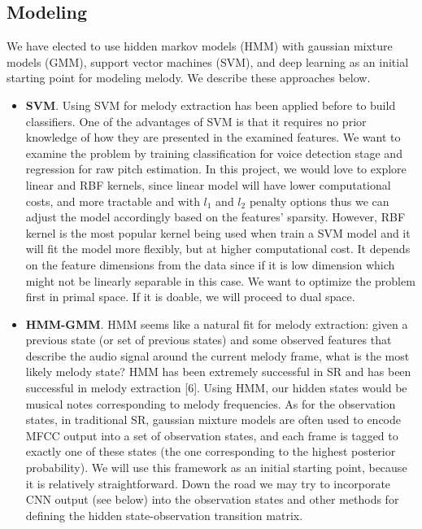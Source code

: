 \documentclass{article} %
\begin{document}
\subsection{Modeling}
We have elected to use hidden markov models (HMM) with gaussian mixture models (GMM), support vector machines (SVM), and deep learning as an initial starting point for modeling melody.  We describe these approaches below.
\begin{itemize}
\item \textbf{SVM}. Using SVM for melody extraction has been applied before to build classifiers. One of the advantages of SVM is that it requires no prior knowledge of how they are presented in the examined features. We want to examine the problem by training classification for voice detection stage and regression for raw pitch estimation. In this project, we would love to explore linear and RBF kernels, since linear model will have lower computational costs, and more tractable and with $l_{1}$ and $l_{2}$ penalty options thus we can adjust the model accordingly based on the features' sparsity. However, RBF kernel is the most popular kernel being used when train a SVM model and it will fit the model more flexibly, but at higher computational cost. It depends on the feature dimensions from the data since if it is low dimension which might not be linearly separable in this case. We want to optimize the problem first in primal space. If it is doable, we will proceed to dual space.  
\item \textbf{HMM-GMM}. HMM seems like a natural fit for melody extraction: given a previous state (or set of previous states) and some observed features that describe the audio signal around the current melody frame, what is the most likely melody state?  HMM has been extremely successful in SR and has been successful in melody extraction [6].  Using HMM, our hidden states would be musical notes corresponding to melody frequencies.  As for the observation states, in traditional SR, gaussian mixture models are often used to encode MFCC output into a set of observation states, and each frame is tagged to exactly one of these states (the one corresponding to the highest posterior probability).  We will use this framework as an initial starting point, because it is relatively straightforward. Down the road we may try to incorporate CNN output (see below) into the observation states and other methods for defining the hidden state-observation transition matrix.
\end{itemize}
\end{document}
